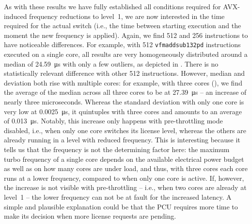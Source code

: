 As with these results we have fully established all conditions required for \gls{AVX}-induced frequency reductions to level~1, we are now interested in the time required for the actual switch (i.e., the time between starting execution and the moment the new frequency is applied). Again, we find \SI[number-unit-product=-]{512}{\bit} and \SI[number-unit-product=-]{256}{\bit} instructions to have noticeable differences. For example, with \SI[number-unit-product=-]{512}{\bit} \texttt{vfmaddsub132pd} instructions executed on a single core, all results are very homogeneously distributed around a median of \SI{24.59}{\micro\second} with only a few outliers, as depicted in . There is no statistically relevant difference with other \SI[number-unit-product=-]{512}{\bit} instructions. However, median and deviation both rise with multiple cores: for example, with three cores (), we find the average of the median across all three cores to be at \SI{27.39}{\micro\second} -- an increase of nearly three microseconds. Whereas the standard deviation with only one core is very low at \SI{0.0025}{\micro\second}, it quintuples with three cores and amounts to an average of \SI{0.013}{\micro\second}. Notably, this increase only happens with pre-throttling mode disabled, i.e., when only one core switches its license level, whereas the others are already running in a level with reduced frequency. This is interesting because it tells us that the frequency is not the determining factor here: the maximum turbo frequency of a single core depends on the available electrical power budget as well as on how many cores are under load, and thus, with three cores each core runs at a lower frequency, compared to when only one core is active. If, however, the increase is not visible with pre-throttling -- i.e., when two cores are already at level~1 -- the lower frequency can not be at fault for the increased latency. A simple and plausible explanation could be that the \gls{PCU} requires more time to make its decision when more license requests are pending.

